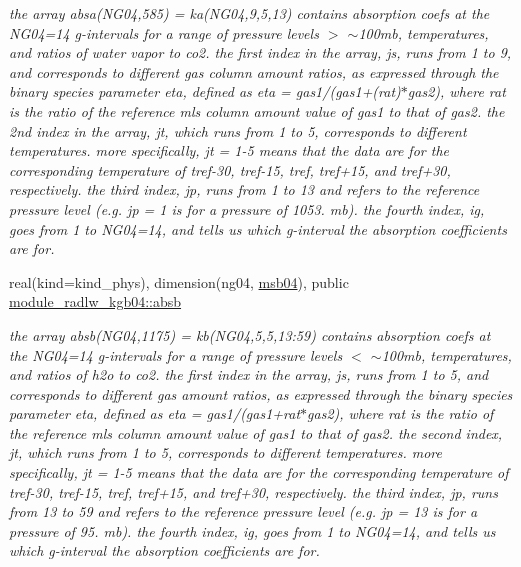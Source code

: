 \begin{DoxyCompactItemize}
\begin{DoxyCompactList}\small\item\em the array absa(\+N\+G04,585) = ka(\+N\+G04,9,5,13) contains absorption coefs at the N\+G04=14 g-\/intervals for a range of pressure levels $>$ $\sim$100mb, temperatures, and ratios of water vapor to co2. the first index in the array, js, runs from 1 to 9, and corresponds to different gas column amount ratios, as expressed through the binary species parameter eta, defined as eta = gas1/(gas1+(rat)$\ast$gas2), where rat is the ratio of the reference mls column amount value of gas1 to that of gas2. the 2nd index in the array, jt, which runs from 1 to 5, corresponds to different temperatures. more specifically, jt = 1-\/5 means that the data are for the corresponding temperature of tref-\/30, tref-\/15, tref, tref+15, and tref+30, respectively. the third index, jp, runs from 1 to 13 and refers to the reference pressure level (e.\+g. jp = 1 is for a pressure of 1053. mb). the fourth index, ig, goes from 1 to N\+G04=14, and tells us which g-\/interval the absorption coefficients are for. \end{DoxyCompactList}\item 
\mbox{\label{group__module__radlw__kgbnn_gaaacc55911b42c67396b5cdc4318e0d5f}} 
real(kind=kind\+\_\+phys), dimension(ng04, \hyperlink{group__module__radlw__kgbnn_gab9ce0111a156f7b80f2adaa9f3e84a32}{msb04}), public \hyperlink{group__module__radlw__kgbnn_gaaacc55911b42c67396b5cdc4318e0d5f}{module\+\_\+radlw\+\_\+kgb04\+::absb}
\begin{DoxyCompactList}\small\item\em the array absb(\+N\+G04,1175) = kb(\+N\+G04,5,5,13\+:59) contains absorption coefs at the N\+G04=14 g-\/intervals for a range of pressure levels $<$ $\sim$100mb, temperatures, and ratios of h2o to co2. the first index in the array, js, runs from 1 to 5, and corresponds to different gas amount ratios, as expressed through the binary species parameter eta, defined as eta = gas1/(gas1+rat$\ast$gas2), where rat is the ratio of the reference mls column amount value of gas1 to that of gas2. the second index, jt, which runs from 1 to 5, corresponds to different temperatures. more specifically, jt = 1-\/5 means that the data are for the corresponding temperature of tref-\/30, tref-\/15, tref, tref+15, and tref+30, respectively. the third index, jp, runs from 13 to 59 and refers to the reference pressure level (e.\+g. jp = 13 is for a pressure of 95. mb). the fourth index, ig, goes from 1 to N\+G04=14, and tells us which g-\/interval the absorption coefficients are for. \end{DoxyCompactList}\item 

\end{DoxyCompactItemize}
